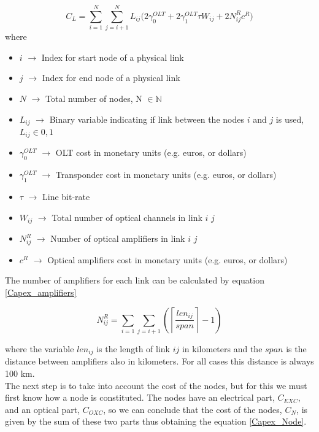 \begin{equation}
C_L = \sum_{i=1}^N \sum_{j=i+1}^N L_{ij} \bigg( 2 \gamma_0^{OLT} + 2 \gamma_1^{OLT} \tau W_{ij} + 2 N^R_{ij} c^R \bigg)
\label{Capex_Link}
\end{equation}
\newpage
\noindent
where
\begin{itemize}
\item{$i$               $\rightarrow$   Index for start node of a physical link}
\item{$j$               $\rightarrow$   Index for end node of a physical link}
\item{$N$				$\rightarrow$	Total number of nodes, N $\in \mathbb{N}$}
\item{$L_{ij}$			$\rightarrow$	Binary variable indicating if link between the nodes $i$ and $j$ is used, $L_{ij} \in {0, 1}$}
\item{$\gamma_0^{OLT}$	$\rightarrow$	OLT cost in monetary units (e.g. euros, or dollars)}
\item{$\gamma_1^{OLT}$	$\rightarrow$	Transponder cost in monetary units (e.g. euros, or dollars)}
\item{$\tau$		    $\rightarrow$	Line bit-rate}
\item{$W_{ij}$          $\rightarrow$   Total number of optical channels in link $i$ $j$}
\item{$N^R_{ij}$    	$\rightarrow$	Number of optical amplifiers in link $i$ $j$}
\item{$c^R$				$\rightarrow$	Optical amplifiers cost in monetary units (e.g. euros, or dollars)}
\end{itemize}

\vspace{11pt}
The number of amplifiers for each link can be calculated by equation \ref{Capex_amplifiers}

\begin{equation}
N^R_{ij} = \sum_{i=1}\sum\limits_{j=i+1}\left(\left\lceil\frac{len_{ij}}{span}\right\rceil-1\right)
\label{Capex_amplifiers}
\end{equation}

\vspace{11pt}
\noindent
where the variable $len_{ij}$ is the length of link $ij$ in kilometers and the $span$ is the distance between amplifiers also in kilometers. For all cases this distance is always 100 km.\\

The next step is to take into account the cost of the nodes, but for this we must first know how a node is constituted. The nodes have an electrical part, $C_{EXC}$, and an optical part, $C_{OXC}$, so we can conclude that the cost of the nodes, $C_N$, is given by the sum of these two parts \cite{aulas} thus obtaining the equation \ref{Capex_Node}.

